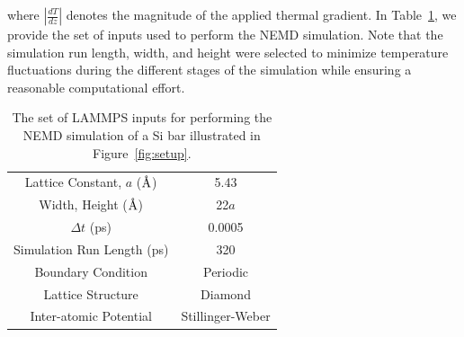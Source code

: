 \ee
%
where $\left|\frac{dT}{dz}\right|$ denotes the magnitude of the applied thermal gradient. In Table~\ref{tab:input},
we provide the set of inputs used to perform the NEMD simulation. Note that the simulation run length, width, 
and height were selected to minimize temperature fluctuations during the different stages of the simulation while
ensuring a reasonable computational effort. 
%
\begin{table}[htbp]
\centering
{}
\begin{tabular}{@{}cc@{}}\toprule
Lattice Constant, $a$ ($\mbox{\normalfont\AA}$) & 5.43 \\ 
Width, Height ($\mbox{\normalfont\AA}$) & 22$a$ \\
$\Delta t$  (ps) & 0.0005 \\ 
Simulation Run Length (ps) & 320 \\ 
Boundary Condition & Periodic \\ 
Lattice Structure & Diamond \\
Inter-atomic Potential & Stillinger-Weber \\ 
\bottomrule
\end{tabular}
\caption{The set of LAMMPS inputs for performing the NEMD simulation of a Si bar illustrated in Figure~\ref{fig:setup}.}
\label{tab:input}
\end{table}
 
